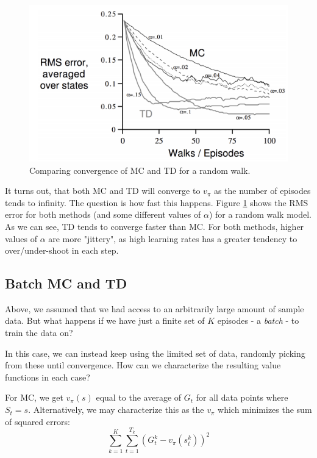 \documentclass[12pt, a4paper]{article}
\numberwithin{equation}{section}
\begin{document}
\begin{figure}
\centering
\includegraphics[width=\textwidth]{random_walk}
\caption{Comparing convergence of MC and TD for a random walk.}
\label{fig:random_walk}
\end{figure}

It turns out, that both MC and TD will converge to $v_\pi$ as the number of episodes tends to infinity. The question is how fast this happens. Figure \ref{fig:random_walk} shows the RMS error for both methods (and some different values of $\alpha$) for a random walk model. As we can see, TD tends to converge faster than MC. For both methods, higher values of $\alpha$ are more "jittery", as high learning rates has a greater tendency to over/under-shoot in each step.

\subsection{Batch MC and TD}
Above, we assumed that we had access to an arbitrarily large amount of sample data. But what happens if we have just a finite set of $K$ episodes - a \textit{batch} - to train the data on?

In this case, we can instead keep using the limited set of data, randomly picking from these until convergence. How can we characterize the resulting value functions in each case?

For MC, we get $v_\pi(s)$ equal to the average of $G_t$ for all data points where $S_t=s$. Alternatively, we may characterize this as the $v_\pi$ which minimizes the sum of squared errors:
\begin{equation}
\sum_{k=1}^K\sum_{t=1}^{T_k}\left(G^k_t-v_\pi(s^k_t)\right)^2
\end{equation}
\end{document}

